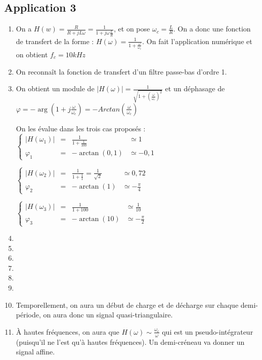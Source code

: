 \documentclass[a4paper,12pt]{book}
\begin{document}
\subsection{Application 3}
\begin{enumerate}
\item On a $H(w)=\frac{R}{R+jL\omega}=\frac{1}{1+j\omega\frac{L}{R}}$, et on pose $\omega_c=\frac{L}{R}$. On a donc une fonction de transfert de la forme : $H(\omega)=\frac{1}{1+\frac{\omega}{\omega_c}}$. On fait l'application numérique et on obtient $f_c=10kHz$
\item On reconnaît la fonction de transfert d'un filtre passe-bas d'ordre 1. 
\item On obtient un module de $\vert H(\omega)\vert =\frac{1}{\sqrt{1+(\frac{\omega}{\omega_c})^2}}$ et un déphasage de $\varphi = -\arg (1+j\frac{\omega}{\omega_c})=-Arctan(\frac{\omega}{\omega_c})$
\par On les évalue dans les trois cas proposés : $\left\{\begin{array}{ccll} \vert H(\omega_1)\vert & = & \frac{1}{1+\frac{1}{100}} & \simeq 1 \\ \varphi_1 & = & -\arctan(0,1) & \simeq -0,1\end{array} \right.$ 
\par $\left\{\begin{array}{ccll} \vert H(\omega_2)\vert & = & \frac{1}{1+\frac{1}{1}}=\frac{1}{\sqrt{2}} & \simeq 0,72 \\ \varphi_2 & = & -\arctan(1) & \simeq -\frac{\pi}{4}\end{array} \right.$
\par $\left\{\begin{array}{ccll} \vert H(\omega_3)\vert & = & \frac{1}{1+100} & \simeq \frac{1}{10} \\ \varphi_3 & = & -\arctan(10) & \simeq -\frac{\pi}{2}\end{array} \right.$
\item 
\item 
\item 
\item 
\item 
\item 
\item Temporellement, on aura un début de charge et de décharge sur chaque demi-période, on aura donc un signal quasi-triangulaire.
\item À hautes fréquences, on aura que $H(\omega)\sim \frac{\omega_c}{\omega}$ qui est un pseudo-intégrateur (puisqu'il ne l'est qu'à hautes fréquences). Un demi-créneau va donner un signal affine. 

\end{enumerate}
\end{document}
